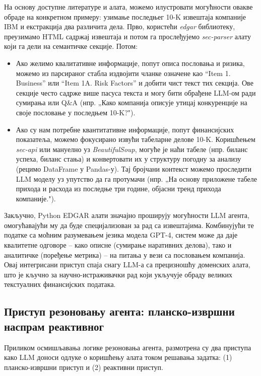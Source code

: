 На основу доступне литературе и алата, можемо илустровати могућности овакве обраде на конкретном примеру: узимање последњег 10-K извештаја компаније IBM и екстракција два различита дела. Прво, користећи \textit{edgar} библиотеку, преузимамо HTML садржај извештаја и потом га прослеђујемо \textit{sec-parser} алату који га дели на семантичке секције. Потом:
\begin{itemize}
    \item Ако желимо квалитативне информације, попут описа пословања и ризика, можемо из парсираног стабла издвојити чланке означене као ``Item 1. Business'' или ``Item 1A. Risk Factors'' и добити чист текст тих секција. Ове секције често садрже више пасуса текста и могу бити обрађене LLM-ом ради сумирања или Q\&A (нпр. „Како компанија описује утицај конкуренције на своје пословање у последњем 10-K?").
    \item Ако су нам потребне квантитативне информације, попут финансијских показатеља, можемо фокусирано извући табеларне делове 10-K. Коришћењем \textit{sec-api} или мануелно уз \textit{BeautifulSoup}, могуће је наћи табеле (нпр. биланс успеха, биланс стања) и конвертовати их у структуру погодну за анализу (рецимо DataFrame у Pandas-у). Тај бројчани контекст можемо проследити LLM моделу уз упутство да га протумачи (нпр. „На основу приложене табеле прихода и расхода из последње три године, објасни тренд прихода компаније.").
\end{itemize}

Закључно, Python EDGAR алати значајно проширују могућности LLM агента, омогућавајући му да буде специјализован за рад са извештајима. Комбинујући те податке са моћним разумевањем језика модела GPT-4, систем може да даје квалитетне одговоре -- како описне (сумирање наративних делова), тако и аналитичке (поређење метрика) -- на питања у вези са пословањем компанија. Овај интегрисани приступ спаја снагу LLM-а са прецизношћу доменских алата, што је кључно за научно-истраживачки рад који укључује обраду великих текстуалних финансијских података.



\subsection{Приступ резоновању агента: планско-извршни наспрам реактивног}

Приликом осмишљавања логике резоновања агента, размотрена су два приступа како LLM доноси одлуке о коришћењу алата током решавања задатка: (1) планско-извршни приступ и (2) реактивни приступ.

